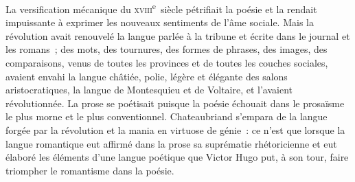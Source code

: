 \documentclass[french,twoside]{book} %
\begin{document}
La versification mécanique du \textsc{xviii}\textsuperscript{e} siècle pétrifiait la poésie et la  
\label{p596}rendait impuissante à exprimer les nouveaux sentiments de l’âme sociale. Mais la révolution avait renouvelé la langue parlée à la tribune et écrite dans le journal et les romans ; des mots, des tournures, des formes de phrases, des images, des comparaisons, venus de toutes les provinces et de toutes les couches sociales, avaient envahi la langue châtiée, polie, légère et élégante des salons aristocratiques, la langue de Montesquieu et de Voltaire, et l’avaient révolutionnée. La prose se poétisait puisque la poésie échouait dans le prosaïsme le plus morne et le plus conventionnel. Chateaubriand s’empara de la langue forgée par la révolution et la mania en virtuose de génie : ce n’est que lorsque la langue romantique eut affirmé dans la prose sa suprématie rhétoricienne et eut élaboré les éléments d’une langue poétique que Victor Hugo put, à son tour, faire triompher le romantisme dans la poésie.
\end{document}
